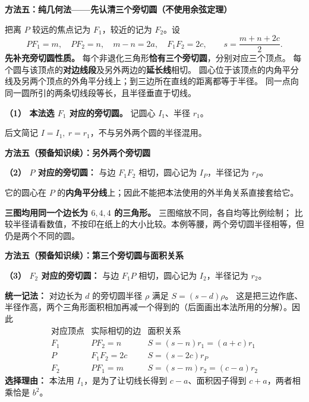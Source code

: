 \clearpage
\begin{proofbox}
\textbf{\textcolor{CProof}{方法五：纯几何法——先认清三个旁切圆（不使用余弦定理）}}

把离 $P$ 较远的焦点记为 $F_1$，较近的记为 $F_2$。设
\[
PF_1=m,\quad PF_2=n,\quad m-n=2a,\quad F_1F_2=2c,
\qquad s=\frac{m+n+2c}{2}.
\]
\textbf{先补充旁切圆性质。} 每个非退化三角形\textbf{恰有三个旁切圆}，分别对应三个顶点。
每个圆与该顶点的\textbf{对边线段}及另外两边的\textbf{延长线}相切。
圆心位于该顶点的内角平分线及另两个顶点的外角平分线上；到三边所在直线的距离都等于半径。
同一点向同一圆所引的两条切线段等长，且半径垂直于切线。

\textbf{（1） 本法选 $F_1$ 对应的旁切圆。} 记圆心 $I_1$、半径 $r_1$。

后文简记 $I=I_1,\ r=r_1$，不与另外两个圆的半径混用。
\end{proofbox}

\clearpage
\begin{proofbox}
\textbf{\textcolor{CProof}{方法五（预备知识续）：另外两个旁切圆}}

\textbf{（2） $P$ 对应的旁切圆：} 与边 $F_1F_2$ 相切，圆心记为 $I_P$，半径记为 $r_P$。

它的圆心在 $P$ 的\textbf{内角平分线}上；因此不能把本法使用的外半角关系直接套给它。

\textbf{三图均用同一个边长为 $6,4,4$ 的三角形。} 三图缩放不同，各自均等比例绘制；
比较半径请看数值，不按印在纸上的大小比较。本例等腰，两个旁切圆半径相等，但仍是两个不同的圆。
\end{proofbox}

\clearpage
\begin{proofbox}
\textbf{\textcolor{CProof}{方法五（预备知识续）：第三个旁切圆与面积关系}}

\textbf{（3） $F_2$ 对应的旁切圆：} 与边 $F_1P$ 相切，圆心记为 $I_2$，半径记为 $r_2$。

\textbf{统一记法：} 对边长为 $d$ 的旁切圆半径 $\rho$ 满足 $S=(s-d)\rho$。
这是把三边作底、半径作高，两个三角形面积相加再减一个得到的（后面画出本法所用的分解）。因此
\[
\begin{array}{c|c|c}
\text{对应顶点}&\text{实际相切的边}&\text{面积关系}\\ \hline
F_1&PF_2=n&S=(s-n)r_1=(a+c)r_1\\
P&F_1F_2=2c&S=(s-2c)r_P\\
F_2&PF_1=m&S=(s-m)r_2=(c-a)r_2
\end{array}
\]
\textbf{选择理由：} 本法用 $I_1$，是为了让切线长得到 $c-a$、面积因子得到 $c+a$，两者相乘恰是 $b^2$。
\end{proofbox}

